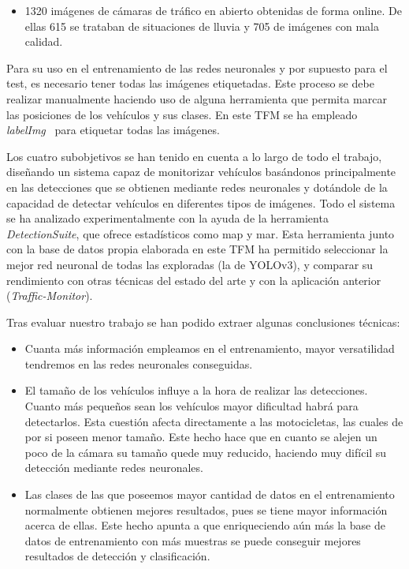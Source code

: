 \begin{itemize}
\begin{itemize}
        \item 1320 imágenes de cámaras de tráfico en abierto obtenidas de forma online. De ellas 615 se trataban de situaciones de lluvia y 705 de imágenes con mala calidad.
    \end{itemize} 
    Para su uso en el entrenamiento de las redes neuronales y por supuesto para el test, es necesario tener todas las imágenes etiquetadas. Este proceso se debe realizar manualmente haciendo uso de alguna herramienta que permita marcar las posiciones de los vehículos y sus clases. En este TFM se ha empleado \textit{labelImg}~\cite{labelimg} para etiquetar todas las imágenes.
\end{itemize}

Los cuatro subobjetivos se han tenido en cuenta a lo largo de todo el trabajo, diseñando un sistema capaz de monitorizar vehículos basándonos principalmente en las detecciones que se obtienen mediante redes neuronales y dotándole de la capacidad de detectar vehículos en diferentes tipos de imágenes.
Todo el sistema se ha analizado experimentalmente con la ayuda de la herramienta \textit{DetectionSuite}, que ofrece estadísticos como \acrshort{map} y \acrshort{mar}. Esta herramienta junto con la base de datos propia elaborada en este TFM ha permitido seleccionar la mejor red neuronal de todas las exploradas (la de YOLOv3), y comparar su rendimiento con otras técnicas del estado del arte y con la aplicación anterior (\textit{Traffic-Monitor}).

Tras evaluar nuestro trabajo se han podido extraer algunas conclusiones técnicas:
\begin{itemize}
    \item Cuanta más información empleamos en el entrenamiento, mayor versatilidad tendremos en las redes neuronales conseguidas.
    \item El tamaño de los vehículos influye a la hora de realizar las detecciones. Cuanto más pequeños sean los vehículos mayor dificultad habrá para detectarlos. Esta cuestión afecta directamente a las motocicletas, las cuales de por si poseen menor tamaño. Este hecho hace que en cuanto se alejen un poco de la cámara su tamaño quede muy reducido, haciendo muy difícil su detección mediante redes neuronales.
    \item Las clases de las que poseemos mayor cantidad de datos en el entrenamiento normalmente obtienen mejores resultados, pues se tiene mayor información acerca de ellas. Este hecho apunta a que enriqueciendo aún más la base de datos de entrenamiento con más muestras se puede conseguir mejores resultados de detección y clasificación.
\end{itemize}


